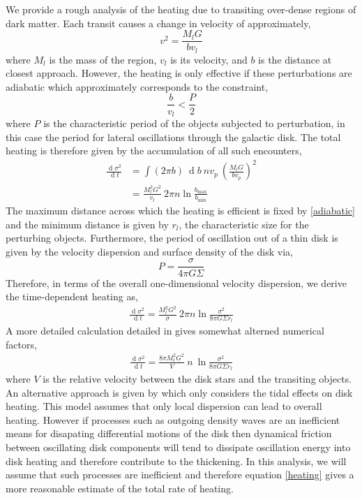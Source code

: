 \documentclass[usenatbib]{mnras}
\renewcommand{\d}[1]{\! \mathrm{d}#1 \:}
\newcommand{\deriv}[2]{\frac{\d{#1}}{\d{#2}}}
\renewcommand{\d}[1]{\ensuremath{\operatorname{d}\!{#1}}}
\begin{document}
We provide a rough analysis of the heating due to transiting over-dense regions of dark matter. Each transit causes a change in velocity of approximately,
\begin{equation}
v^2 = \frac{M_l G}{b v_l}
\end{equation}
where $M_l$ is the mass of the region, $v_l$ is its velocity, and $b$ is the distance at closest approach. However, the heating is only effective if these perturbations are adiabatic which approximately corresponds to the constraint,
\begin{equation} \label{adiabatic}
\frac{b}{v_l} < \frac{P}{2}
\end{equation}
where $P$ is the characteristic period of the objects subjected to perturbation, in this case the period for lateral oscillations through the galactic disk. The total heating is therefore given by the accumulation of all such encounters,
\begin{align}
\deriv{\sigma^2}{t} &= \int (2 \pi b) \: \d{b} \: n v_p \: \left( \frac{M_l G}{b v_p} \right)^2 
\\
& = \frac{M_l^2 G^2}{v_l} \: 2 \pi n \ln{\frac{b_{\mathrm{max}}}{b_{\mathrm{min}}}}
\end{align}
The maximum distance across which the heating is efficient is fixed by \ref{adiabatic} and the minimum distance is given by $r_l$,  the characteristic size for the perturbing objects. Furthermore, the period of oscillation out of a thin disk is given by the velocity dispersion and surface density of the disk via,
\begin{equation}
P = \frac{\sigma}{4 \pi G \Sigma}
\end{equation} 
Therefore, in terms of the overall one-dimensional velocity dispersion, we derive the time-dependent heating as,
\begin{align}
\deriv{\sigma^2}{t}  = \frac{M_l^2 G^2}{\sigma} \: 2 \pi n \ln{\frac{\sigma^2}{8 \pi G \Sigma r_l}}
\end{align}
A more detailed calculation detailed in \cite{milkywayblackholes} gives somewhat alterned numerical factors,
\begin{align} \label{heating}
\deriv{\sigma^2}{t} =\frac{8 \pi M_l^2 G^2}{V} \: n \: \ln{\frac{\sigma^2}{8 \pi G \Sigma r_l}}
\end{align}
where $V$ is the relative velocity between the disk stars and the transiting objects. An alternative approach is given by \cite{ultralight} which only considers the tidal effects on disk heating. This model assumes that only local dispersion can lead to overall heating. However if processes such as outgoing density waves are an inefficient means for disapating differential motions of the disk then dynamical friction between oscillating disk components will tend to dissipate oscillation energy into disk heating and therefore contribute to the thickening. In this analysis, we will assume that such processes are inefficient and therefore equation \ref{heating} gives a more reasonable estimate of the total rate of heating.  
\end{document}
